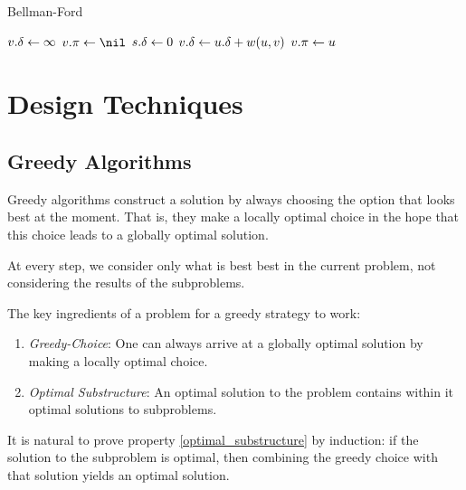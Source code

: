 \begin{algorithm}[h]
\caption{Bellman-Ford}\label{alg:bellmanford}
\begin{algorithmic}[1]
    \State $v\mathtt{.}\mathtt{\delta}\gets\infty$
    \State $\attrib{v}{\pi}\gets\nil$
  \EndFor
  \State $s\mathtt{.}\mathtt{\delta}\gets 0$
        \State $v\mathtt{.}\mathtt{\delta}\gets u\mathtt{.}\mathtt{\delta}+w(u,v)$ 
        \State $v\mathtt{.}\mathtt{\pi}\gets u$
      \EndIf
    \EndFor
  \EndFor
      \State \Return \fals {}
    \EndIf
  \EndFor
  \State \Return \tru
\EndFunction
\end{algorithmic}
\end{algorithm}







\section{Design Techniques}\label{sec:design_techniques}

\subsection{Greedy Algorithms}\label{sec:greedy_algorithms}

Greedy algorithms construct a solution by always choosing the option that looks best at the moment.
That is, they make a locally optimal choice in the hope that this choice leads to a globally optimal solution.

At every step, we consider only what is best best in the current problem, not considering the results of the subproblems.


The key ingredients of a problem for a greedy strategy to work:
\begin{enumerate}
  \item \emph{Greedy-Choice}: \label{greedy_choice_property}
  One can always arrive at a globally optimal solution by making a locally optimal choice.
  \item \emph{Optimal Substructure}:  \label{optimal_substructure}
  An optimal solution to the problem contains within it optimal solutions to subproblems.
\end{enumerate}
It is natural to prove property \ref{optimal_substructure} by induction: 
if the solution to the subproblem is optimal, then combining the greedy choice with that solution yields an optimal solution.


